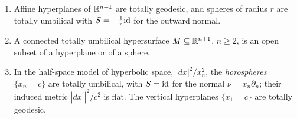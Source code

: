 \begin{proposition}\label{riemannian-geometry:proposition-umbilical}
\begin{enumerate}
\item Affine hyperplanes of $\mathbb{R}^{n+1}$ are totally geodesic, and spheres of radius $r$ are totally umbilical with $S = -\frac1r\mathrm{id}$ for the outward normal.
\item A connected totally umbilical hypersurface $M \subseteq \mathbb{R}^{n+1}$, $n \geq 2$, is an open subset of a hyperplane or of a sphere.
\item In the half-space model of hyperbolic space, $|dx|^2/x_n^2$, the \emph{horospheres} $\{x_n = c\}$ are totally umbilical, with $S = \mathrm{id}$ for the normal $\nu = x_n\partial_n$; their induced metric
$|dx^{\prime}|^2/c^2$ is flat. The vertical hyperplanes $\{x_1 = c\}$ are totally geodesic.
\end{enumerate}
\end{proposition}

